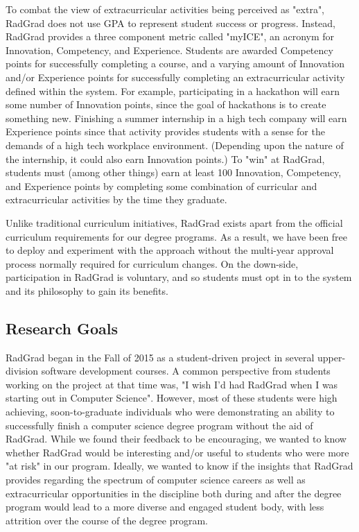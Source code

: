 \documentclass[acmsmall]{acmart}
\begin{document}
To combat the view of extracurricular activities being perceived as "extra", RadGrad does not use GPA to represent student success or progress. Instead, RadGrad provides a three component metric called "myICE", an acronym for Innovation, Competency, and Experience. Students are awarded Competency points for successfully completing a course, and a varying amount of Innovation and/or Experience points for successfully completing an extracurricular activity defined within the system. For example, participating in a hackathon will earn some number of Innovation points, since the goal of hackathons is to create something new.  Finishing a summer internship in a high tech company will earn Experience points since that activity provides students with a sense for the demands of a high tech workplace environment. (Depending upon the nature of the internship, it could also earn Innovation points.) To "win" at RadGrad, students must (among other things) earn at least 100 Innovation, Competency, and Experience points by completing some combination of curricular and extracurricular activities by the time they graduate.

Unlike traditional curriculum initiatives, RadGrad exists apart from the official curriculum requirements for our degree programs. As a result, we have been free to deploy and experiment with the approach without the multi-year approval process normally required for curriculum changes.  On the down-side, participation in RadGrad is voluntary, and so students must opt in to the system and its philosophy to gain its benefits.

\subsection{Research Goals}

RadGrad began in the Fall of 2015 as a student-driven project in several upper-division software development courses.  A common perspective from students working on the project at that time was, "I wish I'd had RadGrad when I was starting out in Computer Science".  However, most of these students were high achieving, soon-to-graduate individuals who were demonstrating an ability to successfully finish a computer science degree program without the aid of RadGrad.  While we found their feedback to be encouraging, we wanted to know whether RadGrad would be interesting and/or useful to students who were more "at risk" in our program. Ideally, we wanted to know if the insights that RadGrad provides regarding the spectrum of computer science careers as well as extracurricular opportunities in the discipline both during and after the degree program would lead to a more diverse and engaged student body, with less attrition over the course of the degree program.
\end{document}
